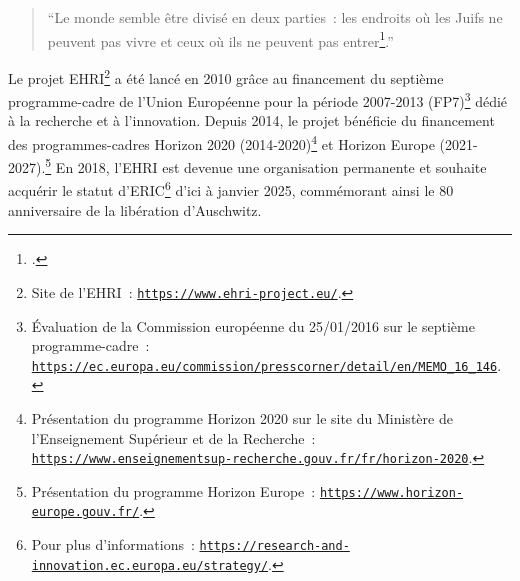 
\begin{quotation}
    \enquote{Le monde semble être divisé en deux parties~: les endroits où les Juifs ne peuvent pas vivre et ceux où ils ne peuvent pas entrer\footcite[p.~27, citation de Haïm Weizmann]{Bensoussan2020}.}
\end{quotation}

Le projet EHRI\footnote{Site de l'EHRI~: \texttt{\href{https://www.ehri-project.eu/}{https://www.ehri-project.eu/}}.} a été lancé en 2010 grâce au financement du septième programme-cadre de l'Union Européenne pour la période 2007-2013 (FP7)\footnote{Évaluation de la Commission européenne du 25/01/2016 sur le septième programme-cadre~: \texttt{\href{https://ec.europa.eu/commission/presscorner/detail/en/MEMO_16_146}{https://ec.europa.eu/commission/presscorner/detail/en/MEMO\_16\_146}}.} dédié à la recherche et à l'innovation. Depuis 2014, le projet bénéficie du financement des programmes-cadres Horizon 2020 (2014-2020)\footnote{Présentation du programme Horizon 2020 sur le site du Ministère de l'Enseignement Supérieur et de la Recherche~: \texttt{\href{https://www.enseignementsup-recherche.gouv.fr/fr/horizon-2020-le-programme-de-l-union-europeenne-pour-la-recherche-et-l-innovation-46458}{https://www.enseignementsup-recherche.gouv.fr/fr/horizon-2020}}.} et Horizon Europe (2021-2027).\footnote{Présentation du programme Horizon Europe~: \texttt{\href{https://www.horizon-europe.gouv.fr/presentation-du-programme-horizon-europe-24104}{https://www.horizon-europe.gouv.fr/}}.} En 2018, l'EHRI est devenue une organisation permanente et souhaite acquérir le statut d'ERIC\footnote{Pour plus d'informations~: \texttt{\href{https://research-and-innovation.ec.europa.eu/strategy/strategy-2020-2024/our-digital-future/european-research-infrastructures/eric_en}{https://research-and-innovation.ec.europa.eu/strategy/}}.} d'ici à janvier 2025, commémorant ainsi le 80\ieme{} anniversaire de la libération d'Auschwitz.

